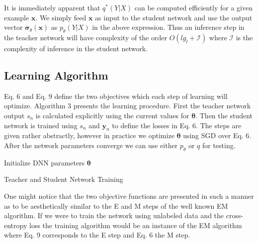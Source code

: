 \documentclass[11pt]{article}
\begin{document}
It is immediately apparent that $q^*(Y|X)$ can be computed efficiently for a given example $\textbf{x}$.  We simply feed $\textbf{x}$ as input to the student network and use the output vector $\boldsymbol{\sigma}_{\theta}(\textbf{x})$ as $p_\theta(Y|X)$ in the above expression.  Thus an inference step in the teacher network will have complexity of the order $O(lg_l + \mathcal{I})$ where $ \mathcal{I}$ is the complexity of inference in the student network.
\subsection{Learning Algorithm}
Eq. 6 and Eq. 9 define the two objectives which each step of learning will optimize.  Algorithm 3 presents the learning procedure.  First the teacher network output $s_n$ is calculated explicitly using the current values for $\boldsymbol{\theta}$.  Then the student network is trained using $s_n$ and $\textbf{y}_n$ to define the losses in Eq. 6.  The steps are given rather abstractly, however in practice we optimize $\boldsymbol{\theta}$ using SGD over Eq. 6.  After the network parameters converge we can use either $p_\theta$ or $q$ for testing.
\begin{mdframed}[linewidth=.8pt]
	\begin{algorithm}[H]
		Initialize DNN parameters $\boldsymbol{\theta}$ \\
		\caption{Teacher and Student Network Training}
	\end{algorithm}
\end{mdframed}
One might notice that the two objective functions are presented in such a manner as to be aesthetically similar to the E and M steps of the well known EM algorithm.  If we were to train the network using unlabeled data and the cross-entropy loss the training algorithm would be an instance of the EM algorithm where Eq. 9 corresponds to the E step and Eq. 6 the M step.
\end{document}
